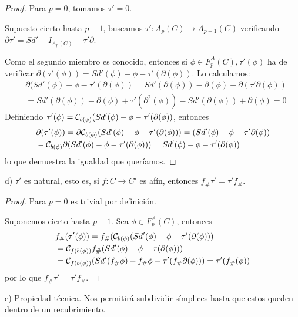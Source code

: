 \begin{proof}
  Para $p = 0$, tomamos $\tau' = 0$.

  Supuesto cierto hasta $p-1$, buscamos $\tau' \colon A_p(C) \to A_{p+1}(C)$ verificando $\partial \tau' = Sd' - I_{A_p(C)} - \tau' \partial$.

  Como el segundo miembro es conocido, entonces si $\phi \in F_p^A(C), \tau'(\phi)$ ha de verificar
  $\partial(\tau'(\phi)) = Sd'(\phi) - \phi - \tau'(\partial(\phi))$. Lo calculamos:
  \begin{align*}
    &\partial(Sd'(\phi) - \phi - \tau'(\partial(\phi)) = Sd'(\partial(\phi)) - \partial(\phi) - \partial(\tau' \partial(\phi)) \\
    &= Sd'(\partial(\phi)) - \partial(\phi) + \tau'(\partial^2(\phi)) - Sd'(\partial(\phi)) + \partial(\phi) = 0
  \end{align*}
  Definiendo $\tau'(\phi) = {\mathcal C}_{b(\phi)}(Sd'(\phi) - \phi - \tau'(\partial(\phi))$, entonces
  \begin{align*}
    &\partial(\tau'(\phi)) = \partial {\mathcal C}_{b(\phi)}(Sd'(\phi) - \phi -\tau'(\partial(\phi))) = (Sd'(\phi) - \phi - \tau' \partial(\phi)) \\
    &- {\mathcal C}_{b(\phi)} \partial(Sd'(\phi) - \phi - \tau'(\partial(\phi))) = Sd'(\phi) - \phi - \tau'(\partial(\phi))
  \end{align*}
  lo que demuestra la igualdad que queríamos.
\end{proof}

d) $\tau'$ es natural, esto es, si $f \colon C \to C'$ es afín, entonces $f_\# \tau' = \tau' f_\#$.

\begin{proof}
  Para $p = 0$ es trivial por definición.

  Suponemos cierto hasta $p-1$. Sea $\phi \in F_p^A(C)$, entonces
  \begin{align*}
    &f_\#(\tau'(\phi)) = f_\#({\mathcal C}_{b(\phi)}(Sd'(\phi) - \phi - \tau'(\partial(\phi))) \\
    &= {\mathcal C}_{f(b(\phi))} f_\#(Sd'(\phi) - \phi - \tau(\partial(\phi))) \\
    &= {\mathcal C}_{f(b(\phi))}(Sd'(f_\# \phi) - f_\# \phi - \tau'(f_\# \partial(\phi))) = \tau'(f_\#(\phi))
  \end{align*}
  por lo que $f_\# \tau' = \tau' f_\#$.
\end{proof}

e) Propiedad técnica. Nos permitirá subdividir símplices hasta que estos queden dentro de un recubrimiento.


